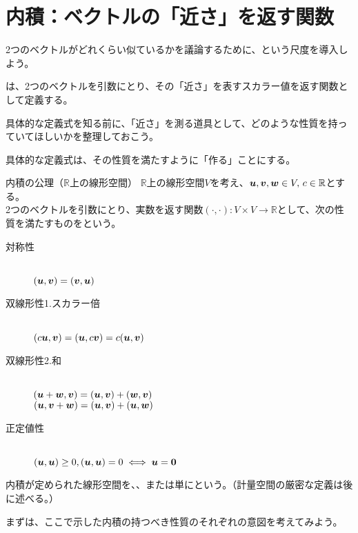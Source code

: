 \documentclass[../../../topic_linear-algebra]{subfiles}
\begin{document}
\sectionline
\section{内積：ベクトルの「近さ」を返す関数}

2つのベクトルがどれくらい似ているかを議論するために、という尺度を導入しよう。

\br

は、2つのベクトルを引数にとり、その「近さ」を表すスカラー値を返す関数として定義する。

\br

具体的な定義式を知る前に、「近さ」を測る道具として、どのような性質を持っていてほしいかを整理しておこう。

具体的な定義式は、その性質を満たすように「作る」ことにする。

\begin{definition}{内積の公理（$\mathbb{R}$上の線形空間）}
  $\mathbb{R}$上の線形空間$V$を考え、$\vb*{u}, \vb*{v}, \vb*{w} \in V,\, c \in \mathbb{R} $とする。\\
  2つのベクトルを引数にとり、実数を返す関数$(\cdot, \cdot): V \times V \to \mathbb{R}$として、次の性質を満たすものをという。
  \begin{description}
    \item[対称性]~\\
          $(\vb*{u}, \vb*{v}) = (\vb*{v}, \vb*{u})$
    \item[双線形性1.スカラー倍]~\\
          $(c\vb*{u}, \vb*{v}) = (\vb*{u}, c\vb*{v}) = c(\vb*{u}, \vb*{v})$
    \item[双線形性2.和]~\\
          $(\vb*{u} + \vb*{w}, \vb*{v}) = (\vb*{u}, \vb*{v}) + (\vb*{w}, \vb*{v})$\\
          $(\vb*{u}, \vb*{v} + \vb*{w}) = (\vb*{u}, \vb*{v}) + (\vb*{u}, \vb*{w})$
    \item[正定値性]~\\
          $(\vb*{u}, \vb*{u}) \geq 0, (\vb*{u}, \vb*{u}) = 0 \iff \vb*{u} = \vb*{0}$
  \end{description}
\end{definition}

内積が定められた線形空間を、、または単にという。（計量空間の厳密な定義は後に述べる。）

\br

まずは、ここで示した内積の持つべき性質のそれぞれの意図を考えてみよう。
\end{document}
